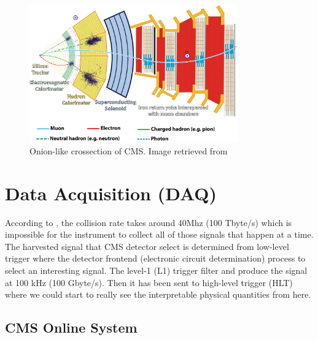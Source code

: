 \begin{figure}[h!]
    \centering
    \includegraphics[width=0.8\textwidth]{images/cms_slide.png}
    \caption{Onion-like crossection of CMS. Image retrieved from \cite{cms_onion}}
    \label{fig:cms_slide}
\end{figure}



\section{Data Acquisition (DAQ)}


According to \cite{cms_tridas_2002}, the collision rate takes around 40Mhz (100 Tbyte/s) which is impossible for the instrument to collect all of those signals that happen at a time.
The harvested signal that CMS detector select is determined from low-level trigger where the detector frontend (electronic circuit determination) process to select an interesting signal.
The level-1 (L1) trigger filter and produce the signal at 100 kHz (100 Gbyte/s). Then it has been sent to high-level trigger (HLT) where we could start to really see the interpretable physical quantities from here.

\subsection{CMS Online System}

